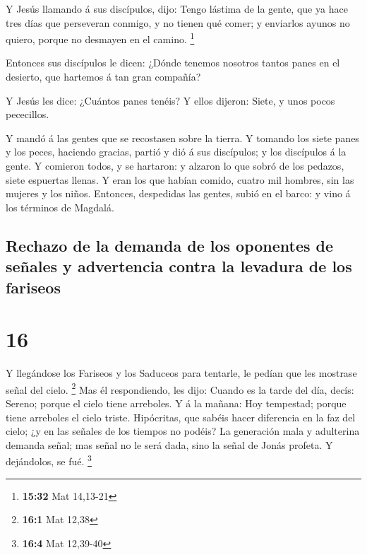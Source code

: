  Y Jesús llamando á sus discípulos, dijo: Tengo lástima de
la gente, que ya hace tres días que perseveran conmigo, y no tienen qué
comer; y enviarlos ayunos no quiero, porque no desmayen en el camino.
\footnote{\textbf{15:32} Mat 14,13-21}

 Entonces sus discípulos le dicen: ¿Dónde tenemos nosotros
tantos panes en el desierto, que hartemos á tan gran compañía?

 Y Jesús les dice: ¿Cuántos panes tenéis? Y ellos dijeron:
Siete, y unos pocos pececillos.

 Y mandó á las gentes que se recostasen sobre la tierra.
 Y tomando los siete panes y los peces, haciendo gracias,
partió y dió á sus discípulos; y los discípulos á la gente.
 Y comieron todos, y se hartaron: y alzaron lo que sobró de
los pedazos, siete espuertas llenas.  Y eran los que habían
comido, cuatro mil hombres, sin las mujeres y los niños. 
Entonces, despedidas las gentes, subió en el barco: y vino á los
términos de Magdalá.

\hypertarget{rechazo-de-la-demanda-de-los-oponentes-de-seuxf1ales-y-advertencia-contra-la-levadura-de-los-fariseos}{%
\subsection{Rechazo de la demanda de los oponentes de señales y
advertencia contra la levadura de los
fariseos}\label{rechazo-de-la-demanda-de-los-oponentes-de-seuxf1ales-y-advertencia-contra-la-levadura-de-los-fariseos}}

\hypertarget{section-15}{%
\section{16}\label{section-15}}

 Y llegándose los Fariseos y los Saduceos para tentarle, le
pedían que les mostrase señal del cielo. \footnote{\textbf{16:1} Mat
  12,38}  Mas él respondiendo, les dijo: Cuando es la tarde
del día, decís: Sereno; porque el cielo tiene arreboles.  Y
á la mañana: Hoy tempestad; porque tiene arreboles el cielo triste.
Hipócritas, que sabéis hacer diferencia en la faz del cielo; ¿y en las
señales de los tiempos no podéis?  La generación mala y
adulterina demanda señal; mas señal no le será dada, sino la señal de
Jonás profeta. Y dejándolos, se fué. \footnote{\textbf{16:4} Mat
  12,39-40}

